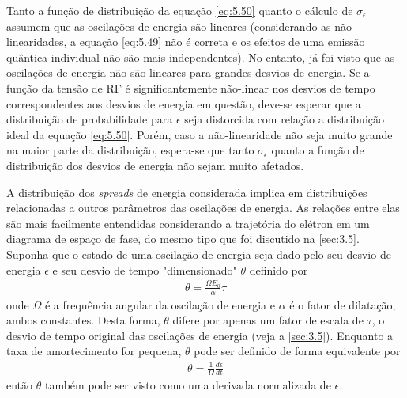Tanto a função de distribuição da equação \eqref{eq:5.50} quanto o cálculo de $\sigma_\epsilon$ assumem que as oscilações de energia são lineares (considerando as não-linearidades, a equação \eqref{eq:5.49} não é correta e os efeitos de uma emissão quântica individual não são mais independentes). No entanto, já foi visto que as oscilações de energia não são lineares para grandes desvios de energia. Se a função da tensão de RF é significantemente não-linear nos desvios de tempo correspondentes aos desvios de energia em questão, deve-se esperar que a distribuição de probabilidade para $\epsilon$ seja distorcida com relação a distribuição ideal da equação \eqref{eq:5.50}. Porém, caso a não-linearidade não seja muito grande na maior parte da distribuição, espera-se que tanto $\sigma_\epsilon$ quanto a função de distribuição dos desvios de energia não sejam muito afetados.

A distribuição dos \textit{spreads} de energia considerada implica em distribuições relacionadas a outros parâmetros das oscilações de energia. As relações entre elas são mais facilmente entendidas considerando a trajetória do elétron em um diagrama de espaço de fase, do mesmo tipo que foi discutido na \autoref{sec:3.5}. Suponha que o estado de uma oscilação de energia seja dado pelo seu desvio de energia $\epsilon$ e seu desvio de tempo "dimensionado" $\theta$ definido por
\begin{align}
	\theta = \frac{\Omega E_0}{\alpha}\tau\label{eq:5.52}
\end{align}
onde $\Omega$ é a frequência angular da oscilação de energia e $\alpha$ é o fator de dilatação, ambos constantes. Desta forma, $\theta$ difere por apenas um fator de escala de $\tau$, o desvio de tempo original das oscilações de energia (veja a \autoref{sec:3.5}). Enquanto a taxa de amortecimento for pequena, $\theta$ pode ser definido de forma equivalente por
\begin{align}
	\theta = \frac{1}{\Omega}\frac{d\epsilon}{dt}
\end{align}
então $\theta$ também pode ser visto como uma derivada normalizada de $\epsilon$.


